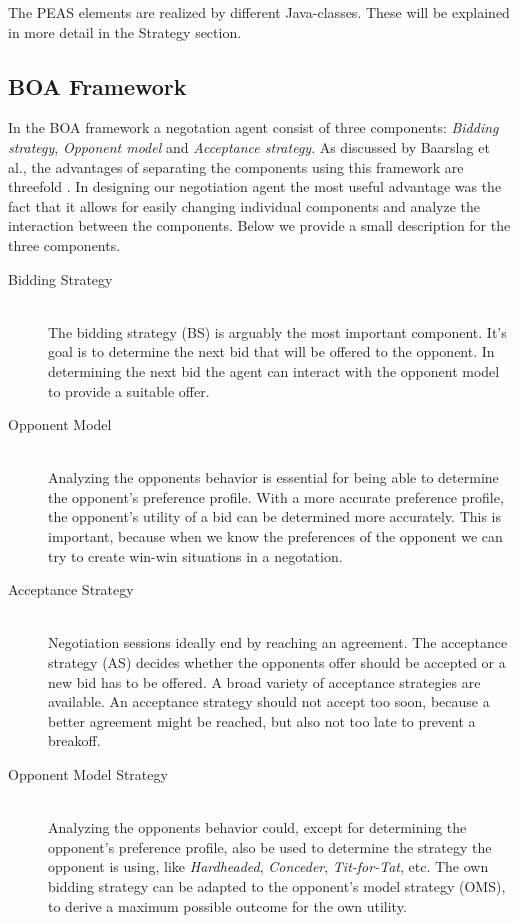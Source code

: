 \documentclass[a4paper,10pt]{article}
\begin{document}
The PEAS elements are realized by different Java-classes. These will be explained in more detail in the Strategy section.

\subsection{BOA Framework}
In the BOA framework a negotation agent consist of three components: \emph{Bidding strategy}, \emph{Opponent model} and \emph{Acceptance strategy}. As discussed by Baarslag et al., the advantages of separating the components using this framework are threefold \cite{baarslag2012decoupling}. In designing our negotiation agent the most useful advantage was the fact that it allows for easily changing individual components and analyze the interaction between the components. Below we provide a small description for the three components.

\begin{description}
  \item[Bidding Strategy] \hfill \\
  The bidding strategy (BS) is arguably the most important component. It's goal is to determine the next bid that will be offered to the opponent. In determining the next bid the agent can interact with the opponent model to provide a suitable offer. 

  \item[Opponent Model] \hfill \\
  Analyzing the opponents behavior is essential for being able to determine the opponent's preference profile.  With a more accurate preference profile, the opponent's utility of a bid can be determined more accurately. This is important, because when we know the preferences of the opponent we can try to create win-win situations in a negotation.

  \item[Acceptance Strategy] \hfill \\
  Negotiation sessions ideally end by reaching an agreement. The acceptance strategy (AS) decides whether the opponents offer should be accepted or a new bid has to be offered. A broad variety of acceptance strategies are available. An acceptance strategy should not accept too soon, because a better agreement might be reached, but also not too late to prevent a breakoff.

\item[Opponent Model Strategy] \hfill \\
  Analyzing the opponents behavior could, except for determining the opponent's preference profile, also be used to determine the strategy the opponent is using, like \emph{Hardheaded}, \emph{Conceder}, \emph{Tit-for-Tat}, etc. The own bidding strategy can be adapted to the opponent's model strategy (OMS), to derive a maximum possible outcome for the own utility.

\end{description}
\end{document}
